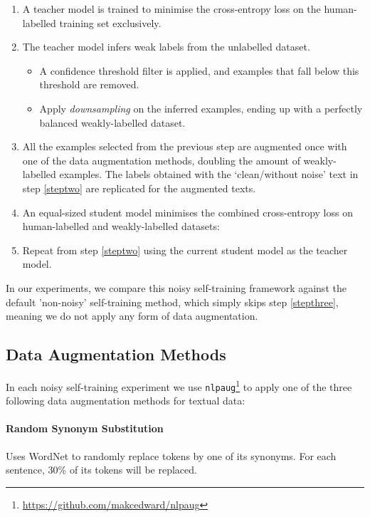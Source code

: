 \documentclass[11pt,a4paper]{article}
\begin{document}
\begin{enumerate}
\item A teacher model is trained to minimise the cross-entropy loss on the human-labelled training set exclusively.
\item The teacher model infers weak labels from the unlabelled dataset. \label{steptwo}
\begin{itemize}
\item A confidence threshold filter is applied, and examples that fall below this threshold are removed.
\item Apply \textit{downsampling} on the inferred examples, ending up with a perfectly balanced weakly-labelled dataset.
\end{itemize}
\item All the examples selected from the previous step are augmented once with one of the data augmentation methods, doubling the amount of weakly-labelled examples. The labels obtained with the `clean/without noise' text in step \ref{steptwo} are replicated for the augmented texts. \label{stepthree}
\item An equal-sized student model minimises the combined cross-entropy loss on human-labelled and weakly-labelled datasets:

\item Repeat from step \ref{steptwo} using the current student model as the teacher model.

\end{enumerate}

In our experiments, we compare this noisy self-training framework against the default 'non-noisy' self-training method, which simply skips step \ref{stepthree}, meaning we do not apply any form of data augmentation.

\subsection{Data Augmentation Methods} \label{sec:data_augmentations}
In each noisy self-training experiment we use \texttt{nlpaug}\footnote{\url{https://github.com/makcedward/nlpaug}} to apply one of the three following data augmentation methods for textual data:

\paragraph*{Random Synonym Substitution} Uses WordNet \cite{miller1995wordnet} to randomly replace tokens by one of its synonyms. For each sentence, 30\% of its tokens will be replaced.
\end{document}
